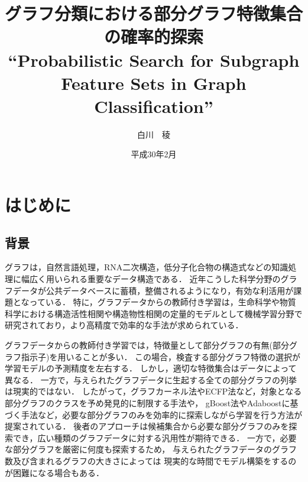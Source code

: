 \documentclass[12pt,fleqn]{jsotsuron}
\title{グラフ分類における部分グラフ特徴集合の確率的探索\\
``Probabilistic Search for Subgraph Feature Sets in Graph Classification''}
\author{白川　稜}
\date{平成30年2月}
\begin{document}
\maketitle
\tableofcontents
\newpage


\chapter{はじめに}
\section{背景}
グラフは，自然言語処理\cite{Adaboost}，RNA二次構造\cite{DBLP:conf/psb/KarklinMH05}，低分子化合物の構造式\cite{Takigawa201350}などの知識処理に幅広く用いられる重要なデータ構造である．
近年こうした科学分野のグラフデータが公共データベースに蓄積，整備されるようになり，有効な利活用が課題となっている．
特に，グラフデータからの教師付き学習は，生命科学や物質科学における構造活性相関や構造物性相関の定量的モデルとして機械学習分野で研究されており，より高精度で効率的な手法が求められている．

グラフデータからの教師付き学習では，特徴量として部分グラフの有無(部分グラフ指示子)を用いることが多い．
この場合，検査する部分グラフ特徴の選択が学習モデルの予測精度を左右する．
しかし，適切な特徴集合はデータによって異なる．
一方で，与えられたグラフデータに生起する全ての部分グラフの列挙は現実的ではない．
したがって，グラフカーネル法\cite{DBLP:journals/jmlr/ShervashidzeSLMB11}やECFP法\cite{DBLP:journals/jcisd/RogersH10}など，対象となる部分グラフのクラスを予め発見的に制限する手法や，
gBoost法\cite{gBoost}やAdaboostに基づく手法\cite{Adaboost}など，必要な部分グラフのみを効率的に探索しながら学習を行う方法が提案されている．
後者のアプローチは候補集合から必要な部分グラフのみを探索でき，広い種類のグラフデータに対する汎用性が期待できる．
一方で，必要な部分グラフを厳密に何度も探索するため，
与えられたグラフデータのグラフ数及び含まれるグラフの大きさによっては
現実的な時間でモデル構築をするのが困難になる場合もある．
\end{document}

